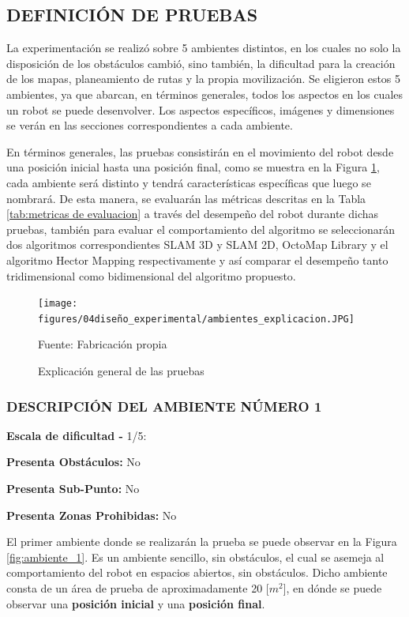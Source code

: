 \newpage
\subsection{DEFINICIÓN DE PRUEBAS}
La experimentación se realizó sobre 5 ambientes distintos, en los cuales no solo la disposición de los obstáculos cambió, sino también, la dificultad para la creación de los mapas, planeamiento de rutas y la propia movilización. Se eligieron estos 5 ambientes, ya que abarcan, en términos generales, todos los aspectos en los cuales un robot se puede desenvolver. Los aspectos específicos, imágenes y dimensiones se verán en las secciones correspondientes a cada ambiente. 

En términos generales, las pruebas consistirán en el movimiento del robot desde una posición inicial hasta una posición final, como se muestra en la Figura \ref{fig:ambientes_explicacion}, cada ambiente será distinto y tendrá características específicas que luego se nombrará. De esta manera, se evaluarán las métricas descritas en la Tabla \ref{tab:metricas de evaluacion}  a través del desempeño del robot durante dichas pruebas, también para evaluar el comportamiento del algoritmo se seleccionarán dos algoritmos correspondientes SLAM 3D y SLAM 2D, OctoMap Library y el algoritmo Hector Mapping respectivamente y así comparar el desempeño tanto tridimensional como bidimensional del algoritmo propuesto.

\begin{figure}[H]
\centering
\texttt{[image: figures/04diseño\_experimental/ambientes\_explicacion.JPG]}
\caption{\label{fig:ambientes_explicacion} Explicación general de las pruebas} 
Fuente: Fabricación propia
\end{figure}

\newpage
\subsubsection{DESCRIPCIÓN DEL AMBIENTE NÚMERO 1}
\textbf{Escala de dificultad - } 1/5:

\hspace{5mm} \textbf{Presenta Obstáculos:} No

\hspace{5mm} \textbf{Presenta Sub-Punto:} No

\hspace{5mm} \textbf{Presenta Zonas Prohibidas:} No

El primer ambiente donde se realizarán la prueba se puede observar en la Figura \ref{fig:ambiente_1}. Es un ambiente sencillo, sin obstáculos, el cual se asemeja al comportamiento del robot en espacios abiertos, sin obstáculos. Dicho ambiente consta de un área de prueba de aproximadamente 20 [$m^{2}$], en dónde se puede observar una \textbf{posición inicial} y una \textbf{posición final}.

